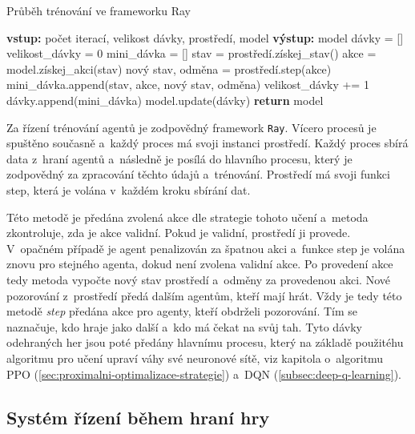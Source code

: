 \begin{algorithm}[H]
  \caption{Průběh trénování ve frameworku Ray}
  \label{alg:training}
  \begin{algorithmic}
    \State \textbf{vstup:} počet iterací, velikost dávky, prostředí, model
    \State \textbf{výstup:} model
    \State
    \State dávky = []
        \State velikost\_dávky = 0
        \State mini\_dávka = []
          \State stav = prostředí.získej\_stav()
          \State akce = model.získej\_akci(stav)
          \State nový stav, odměna = prostředí.step(akce)
          \State mini\_dávka.append(stav, akce, nový stav, odměna)
          \State velikost\_dávky += 1
        \EndWhile
        \State dávky.append(mini\_dávka)
      \EndFor 
      \State model.update(dávky)
    \EndFor
    \State \textbf{return} model
  \end{algorithmic}
\end{algorithm}


Za řízení trénování agentů je zodpovědný framework \texttt{Ray}.
Vícero procesů je spuštěno současně a~každý proces má svoji instanci prostředí.
Každý proces sbírá data z~hraní agentů a~následně je posílá do hlavního procesu, který je zodpovědný za zpracování těchto údajů a~trénování.
Prostředí má svoji funkci step, která je volána v~každém kroku sbírání dat.

Této metodě je předána zvolená akce dle strategie tohoto učení a~metoda zkontroluje, zda je akce validní.
Pokud je validní, prostředí ji provede.
V~opačném případě je agent penalizován za špatnou akci a~funkce step je volána znovu pro stejného agenta, dokud není zvolena validní akce.
Po provedení akce tedy metoda vypočte nový stav prostředí a~odměny za provedenou akci.
Nové pozorování z~prostředí předá dalším agentům, kteří mají hrát.
Vždy je tedy této metodě \emph{step} předána akce pro agenty, kteří obdrželi pozorování.
Tím se naznačuje, kdo hraje jako další a~kdo má čekat na svůj tah.
Tyto dávky odehraných her jsou poté předány hlavnímu procesu, který na základě použitéhu algoritmu pro učení upraví váhy své neuronové sítě, viz kapitola o~algoritmu PPO (\ref{sec:proximalni-optimalizace-strategie}) a~DQN (\ref{subsec:deep-q-learning}).

\subsection{Systém řízení během hraní hry}

